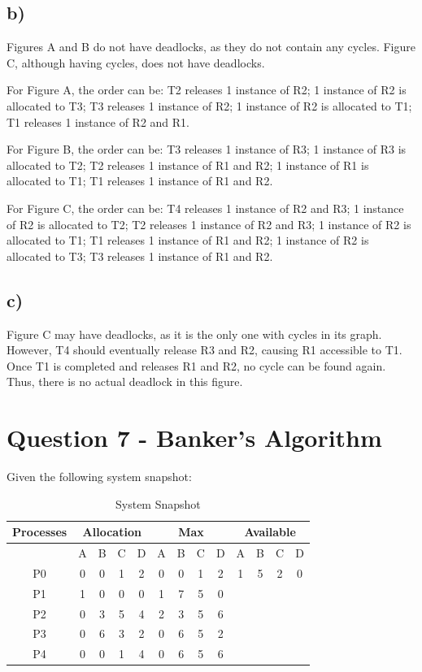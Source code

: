 \documentclass[../main.tex]{subfiles}
\begin{document}
\subsection*{b)}

Figures A and B do not have deadlocks, as they do not contain any cycles. Figure C, although having cycles, does not have deadlocks.  

For Figure A, the order can be: T2 releases 1 instance of R2; 1 instance of R2 is allocated to T3; T3 releases 1 instance of R2; 1 instance of R2 is allocated to T1; T1 releases 1 instance of R2 and R1.  

For Figure B, the order can be: T3 releases 1 instance of R3; 1 instance of R3 is allocated to T2; T2 releases 1 instance of R1 and R2; 1 instance of R1 is allocated to T1; T1 releases 1 instance of R1 and R2.  

For Figure C, the order can be: T4 releases 1 instance of R2 and R3; 1 instance of R2 is allocated to T2; T2 releases 1 instance of R2 and R3; 1 instance of R2 is allocated to T1; T1 releases 1 instance of R1 and R2; 1 instance of R2 is allocated to T3; T3 releases 1 instance of R1 and R2.

\subsection*{c)}

Figure C may have deadlocks, as it is the only one with cycles in its graph. However, T4 should eventually release R3 and R2, causing R1 accessible to T1. Once T1 is completed and releases R1 and R2, no cycle can be found again. Thus, there is no actual deadlock in this figure.

\newpage

\section{Question 7 - Banker's Algorithm}

Given the following system snapshot:

\begin{table}[h!]
    \centering
    \begin{tabular}{|c|cccc|cccc|cccc|}
        \hline
        \textbf{Processes} & \multicolumn{4}{c|}{\textbf{Allocation}} & \multicolumn{4}{c|}{\textbf{Max}} & \multicolumn{4}{c|}{\textbf{Available}} \\
        \hline
        & A & B & C & D & A & B & C & D & A & B & C & D \\
        \hline
        P0 & 0 & 0 & 1 & 2 & 0 & 0 & 1 & 2 & 1 & 5 & 2 & 0 \\
        P1 & 1 & 0 & 0 & 0 & 1 & 7 & 5 & 0 &  &  &  &  \\
        P2 & 0 & 3 & 5 & 4 & 2 & 3 & 5 & 6 &  &  &  &  \\
        P3 & 0 & 6 & 3 & 2 & 0 & 6 & 5 & 2 &  &  &  &  \\
        P4 & 0 & 0 & 1 & 4 & 0 & 6 & 5 & 6 &  &  &  &  \\
        \hline
    \end{tabular}
    \caption{System Snapshot}
\end{table}
\end{document}
